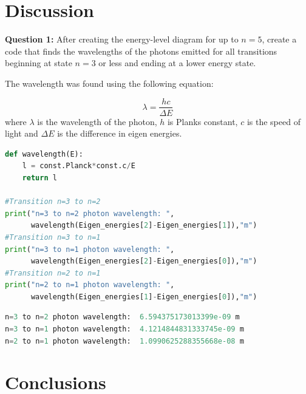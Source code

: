 \section{Discussion}
\textbf{Question 1:}
After creating the energy-level diagram for up to $n=5$, create a code that finds the wavelengths of the photons emitted for all transitions beginning at state $n=3$ or less and ending at a lower energy state.

The wavelength was found using the following equation:

\[\lambda = \frac{hc}{\Delta E}\]
where $\lambda$ is the wavelength of the photon, $h$ is Planks constant, $c$ is the speed of light and $\Delta E$ is the difference in eigen energies.

\begin{lstlisting}[language=Python]
def wavelength(E):
    l = const.Planck*const.c/E
    return l

#Transition n=3 to n=2
print("n=3 to n=2 photon wavelength: ", 
      wavelength(Eigen_energies[2]-Eigen_energies[1]),"m")
#Transition n=3 to n=1
print("n=3 to n=1 photon wavelength: ", 
      wavelength(Eigen_energies[2]-Eigen_energies[0]),"m")
#Transition n=2 to n=1
print("n=2 to n=1 photon wavelength: ", 
      wavelength(Eigen_energies[1]-Eigen_energies[0]),"m")
\end{lstlisting}

\begin{lstlisting}[language=Python]
n=3 to n=2 photon wavelength:  6.594375173013399e-09 m
n=3 to n=1 photon wavelength:  4.1214844831333745e-09 m
n=2 to n=1 photon wavelength:  1.0990625288355668e-08 m
\end{lstlisting}

\section{Conclusions}